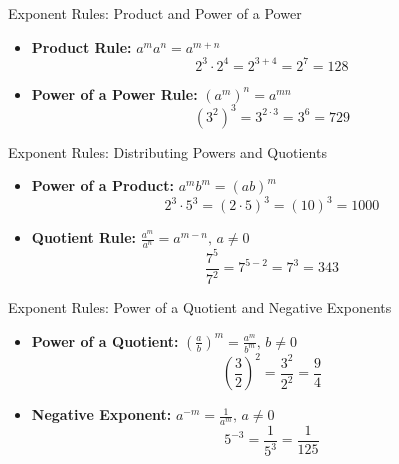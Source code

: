\documentclass[aspectratio=169]{beamer}
\begin{document}
\begin{frame}{Exponent Rules: Product and Power of a Power}\label{example1}
\vspace{-1cm}
\begin{itemize}
    \item \textbf{Product Rule:} $a^m a^n = a^{m+n}$
    \[
    2^3 \cdot 2^4 = 2^{3+4} = 2^7 = 128
    \]

    \item \textbf{Power of a Power Rule:} $(a^m)^n = a^{mn}$
    \[
    (3^2)^3 = 3^{2 \cdot 3} = 3^6 = 729
    \]
\end{itemize}
\end{frame}

\begin{frame}{Exponent Rules: Distributing Powers and Quotients}\label{example2}
\vspace{-1cm}
\begin{itemize}
    \item \textbf{Power of a Product:} $ a^m b^m = (ab)^m$
    \[
    2^3 \cdot 5^3 = (2 \cdot 5)^3 = (10)^3 = 1000
    \]

    \item \textbf{Quotient Rule:} $\frac{a^m}{a^n} = a^{m-n}, \, a \ne 0$
    \[
    \frac{7^5}{7^2} = 7^{5-2} = 7^3 = 343
    \]
\end{itemize}
\end{frame}

\begin{frame}{Exponent Rules: Power of a Quotient and Negative Exponents}\label{example3}
\vspace{-1cm}
\begin{itemize}
    \item \textbf{Power of a Quotient:} $\left(\frac{a}{b}\right)^m = \frac{a^m}{b^m}, \, b \ne 0$
    \[
    \left(\frac{3}{2}\right)^2 = \frac{3^2}{2^2} = \frac{9}{4}
    \]

    \item \textbf{Negative Exponent:} $a^{-m} = \frac{1}{a^m}, \, a \ne 0$
    \[
    5^{-3} = \frac{1}{5^3} = \frac{1}{125}
    \]
\end{itemize}
\end{frame}
\end{document}
